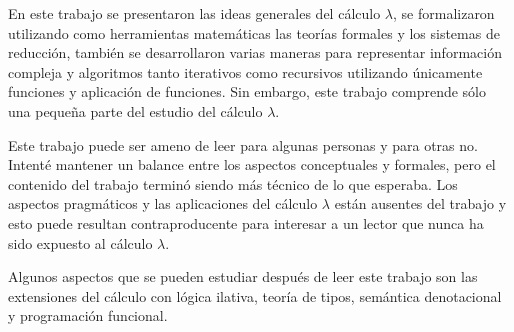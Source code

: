 En este trabajo se presentaron las ideas generales del cálculo \( λ \), se formalizaron utilizando como herramientas matemáticas las teorías formales y los sistemas de reducción, también se desarrollaron varias maneras para representar información compleja y algoritmos tanto iterativos como recursivos utilizando únicamente funciones y aplicación de funciones. Sin embargo, este trabajo comprende sólo una pequeña parte del estudio del cálculo \( λ \).

Este trabajo puede ser ameno de leer para algunas personas y para otras no. Intenté mantener un balance entre los aspectos conceptuales y formales, pero el contenido del trabajo terminó siendo más técnico de lo que esperaba. Los aspectos pragmáticos y las aplicaciones del cálculo \( λ \) están ausentes del trabajo y esto puede resultan contraproducente para interesar a un lector que nunca ha sido expuesto al cálculo \( λ \).

Algunos aspectos que se pueden estudiar después de leer este trabajo son las extensiones del cálculo con lógica ilativa, teoría de tipos, semántica denotacional y programación funcional.


